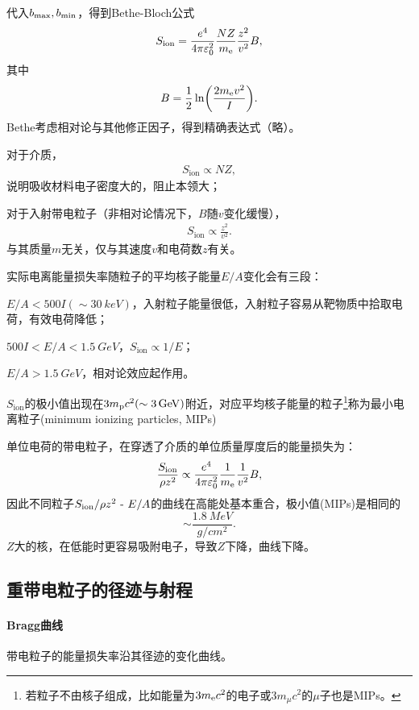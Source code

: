 代入$b_\mathrm{max},b_\mathrm{min}$，得到Bethe-Bloch公式
\begin{align}\label{Bethe-formula}
	S_{\mathrm{ion}}=\frac{e^4}{4\pi\varepsilon_0^2}\frac{NZ}{m_\mathrm e}\frac{z^2}{v^2}B,
\end{align}
其中 
\[
	B=\frac12\ln\biggl(\frac{2m_\mathrm e v^2}I\biggr).
\]
Bethe考虑相对论与其他修正因子，得到精确表达式（略）。


对于介质，
\begin{align}
	S_{\mathrm{ion}}\propto NZ,
\end{align}
说明吸收材料电子密度大的，阻止本领大；

对于入射带电粒子（非相对论情况下，$B$随$v$变化缓慢），
\begin{align}
	S_{\mathrm{ion}}\propto\frac{z^2}{v^2}.
\end{align}
与其质量$m$无关，仅与其速度$v$和电荷数$z$有关。

实际电离能量损失率随粒子的平均核子能量$E/A$变化会有三段：
\begin{compactenum}
	\item $E/A<500I(\sim\SI{30}{keV})$，入射粒子能量很低，入射粒子容易从靶物质中拾取电荷，有效电荷降低；
	\item $500I<E/A<\SI{1.5}{GeV}$，$S_{\mathrm{ion}}\propto1/E$；
	\item $E/A>\SI{1.5}{GeV}$，相对论效应起作用。
\end{compactenum}
$S_{\mathrm{ion}}$的极小值出现在$3m_\mathrm p c^2(\sim\SI{3}{GeV})$附近，对应平均核子能量的粒子\footnote{若粒子不由核子组成，比如能量为$3m_\mathrm e c^2$的电子或$3m_\mu c^2$的$\mu$子也是MIPs。}称为最小电离粒子(minimum ionizing particles, MIPs)

单位电荷的带电粒子，在穿透了介质的单位质量厚度后的能量损失为：
\[
	\frac{S_{\mathrm{ion}}}{\rho z^2}\propto\frac{e^4}{4\pi\varepsilon_0^2}\frac{1}{m_\mathrm e}\frac{1}{v^2}B,
\]
因此不同粒子$S_{\mathrm{ion}}/\rho z^2~\text{-}~ E/A$的曲线在高能处基本重合，极小值(MIPs)是相同的
\[
	\sim\frac{\SI{1.8}{MeV}}{\si{g/cm^2}}.
\]
$Z$大的核，在低能时更容易吸附电子，导致$Z$下降，曲线下降。

\subsection{重带电粒子的径迹与射程}

\paragraph{Bragg曲线}带电粒子的能量损失率沿其径迹的变化曲线。

